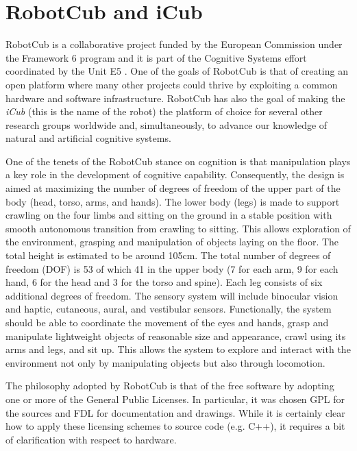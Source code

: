 
\section{RobotCub and iCub}
RobotCub is a collaborative project funded by the European Commission under 
the Framework 6 program and it is part of the Cognitive Systems effort 
coordinated by the Unit E5 \cite{}. %
One of the goals of RobotCub is that of creating an open platform where
many other projects could thrive by exploiting a common hardware and software
infrastructure. RobotCub has also the goal of making the {\em iCub} (this is 
the name of the robot) the platform of choice for several other research
groups worldwide and, simultaneously, to advance our knowledge of natural and
artificial cognitive systems.

One of the tenets of the RobotCub stance on cognition is that manipulation 
plays a key role in the development of cognitive capability. Consequently, 
the design is aimed at maximizing the number of degrees of freedom of the upper 
part of the body (head, torso, arms, and hands). The lower body (legs) is made 
to support crawling on the four limbs and sitting on the ground in a stable 
position with smooth autonomous transition from crawling to sitting. This  
allows exploration of the environment, grasping and manipulation of objects 
laying on the floor. The total height is estimated to be around 105cm. The 
total number of degrees of freedom (DOF) is 53 of which 41 in the upper body 
(7 for each arm, 9 for each hand, 6 for the head and 3 for the torso and spine). 
Each leg consists of six additional degrees of freedom. The sensory system will 
include binocular vision and haptic, cutaneous, aural, and vestibular sensors. 
Functionally, the system should be able to coordinate the movement of the eyes 
and hands, grasp and manipulate lightweight objects of reasonable size and 
appearance, crawl using its arms and legs, and sit up. This allows the system 
to explore and interact with the environment not only by manipulating objects 
but also through locomotion.

The philosophy adopted by RobotCub is that of
the free software by adopting one or more of the General Public Licenses. 
In particular, it was chosen GPL for the sources and FDL for documentation
and drawings. While it is certainly clear how to apply these licensing
schemes to source code (e.g. C++), it requires a bit of clarification 
with respect to hardware. 

